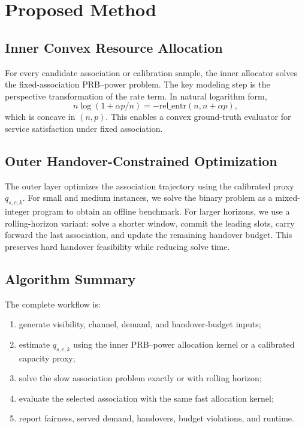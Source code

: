 
\section{Proposed Method}

\subsection{Inner Convex Resource Allocation}

For every candidate association or calibration sample, the inner allocator
solves the fixed-association PRB--power problem. The key modeling step is the
perspective transformation of the rate term. In natural logarithm form,
\begin{equation}
    n \log \left(1 + \alpha p/n\right)
    =
    -\mathrm{rel\_entr}(n,n+\alpha p),
\end{equation}
which is concave in $(n,p)$. This enables a convex ground-truth evaluator for
service satisfaction under fixed association.

\subsection{Outer Handover-Constrained Optimization}

The outer layer optimizes the association trajectory using the calibrated proxy
$q_{s,c,k}$. For small and medium instances, we solve the binary problem as a
mixed-integer program to obtain an offline benchmark. For larger horizons, we
use a rolling-horizon variant: solve a shorter window, commit the leading
slots, carry forward the last association, and update the remaining handover
budget. This preserves hard handover feasibility while reducing solve time.

\subsection{Algorithm Summary}

The complete workflow is:
\begin{enumerate}
\item generate visibility, channel, demand, and handover-budget inputs;
\item estimate $q_{s,c,k}$ using the inner PRB--power allocation kernel or a
calibrated capacity proxy;
\item solve the slow association problem exactly or with rolling horizon;
\item evaluate the selected association with the same fast allocation kernel;
\item report fairness, served demand, handovers, budget violations, and runtime.
\end{enumerate}
